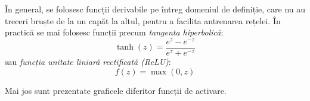 În general, se folosesc funcții derivabile pe întreg domeniul de definiție, care nu au treceri bruște de la un capăt la altul, pentru a facilita antrenarea rețelei. În practică se mai folosesc funcții precum \textit{tangenta hiperbolică}:
\begin{equation}
\tanh(z)=\frac{e^z - e^{-z}}{e^z + e^{-z}}
\end{equation}
sau \textit{funcția unitate liniară rectificată (ReLU)}:
\begin{equation}
f(z)=\max(0,z)
\end{equation}

Mai jos sunt prezentate graficele diferitor funcții de activare.

\begin{figure}[ht]
\centering
{}
\qquad
{}
\qquad
{}

\end{figure}
